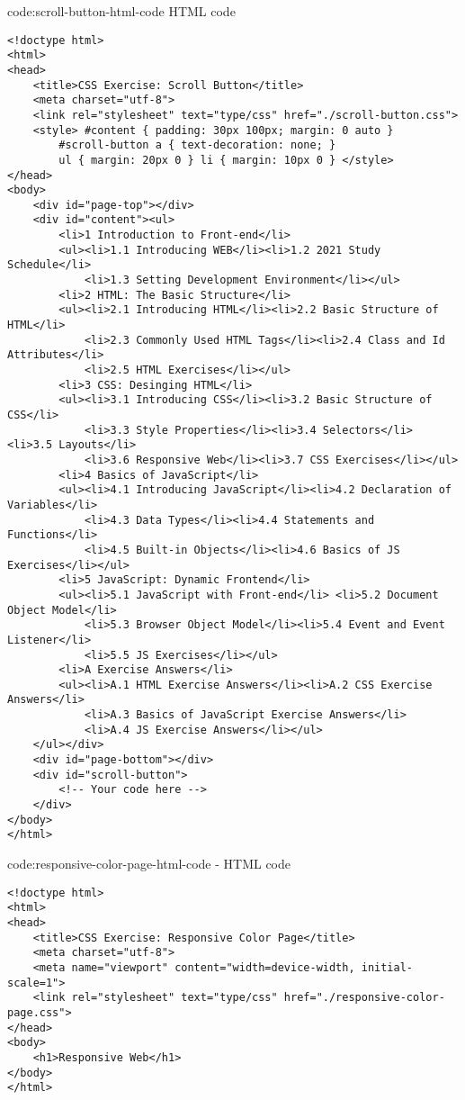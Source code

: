 \begin{codeenv}{code:scroll-button-html-code}{ HTML code}
\begin{verbatim}
<!doctype html>
<html>
<head>
    <title>CSS Exercise: Scroll Button</title>
    <meta charset="utf-8">
    <link rel="stylesheet" text="type/css" href="./scroll-button.css">
    <style> #content { padding: 30px 100px; margin: 0 auto }
        #scroll-button a { text-decoration: none; }
        ul { margin: 20px 0 } li { margin: 10px 0 } </style>
</head>
<body>
    <div id="page-top"></div>
    <div id="content"><ul>
        <li>1 Introduction to Front-end</li>
        <ul><li>1.1 Introducing WEB</li><li>1.2 2021 Study Schedule</li>
            <li>1.3 Setting Development Environment</li></ul>
        <li>2 HTML: The Basic Structure</li>
        <ul><li>2.1 Introducing HTML</li><li>2.2 Basic Structure of HTML</li>
            <li>2.3 Commonly Used HTML Tags</li><li>2.4 Class and Id Attributes</li>
            <li>2.5 HTML Exercises</li></ul>
        <li>3 CSS: Desinging HTML</li>
        <ul><li>3.1 Introducing CSS</li><li>3.2 Basic Structure of CSS</li>
            <li>3.3 Style Properties</li><li>3.4 Selectors</li> <li>3.5 Layouts</li>
            <li>3.6 Responsive Web</li><li>3.7 CSS Exercises</li></ul>
        <li>4 Basics of JavaScript</li>
        <ul><li>4.1 Introducing JavaScript</li><li>4.2 Declaration of Variables</li>
            <li>4.3 Data Types</li><li>4.4 Statements and Functions</li>
            <li>4.5 Built-in Objects</li><li>4.6 Basics of JS Exercises</li></ul>
        <li>5 JavaScript: Dynamic Frontend</li>
        <ul><li>5.1 JavaScript with Front-end</li> <li>5.2 Document Object Model</li>
            <li>5.3 Browser Object Model</li><li>5.4 Event and Event Listener</li>
            <li>5.5 JS Exercises</li></ul>
        <li>A Exercise Answers</li>
        <ul><li>A.1 HTML Exercise Answers</li><li>A.2 CSS Exercise Answers</li>
            <li>A.3 Basics of JavaScript Exercise Answers</li>
            <li>A.4 JS Exercise Answers</li></ul>
    </ul></div>
    <div id="page-bottom"></div>
    <div id="scroll-button">
        <!-- Your code here -->
    </div>
</body>
</html>
\end{verbatim}
\end{codeenv}

\begin{codeenv}{code:responsive-color-page-html-code}{ - HTML code}
\begin{verbatim}
<!doctype html>
<html>
<head>
    <title>CSS Exercise: Responsive Color Page</title>
    <meta charset="utf-8">
    <meta name="viewport" content="width=device-width, initial-scale=1">
    <link rel="stylesheet" text="type/css" href="./responsive-color-page.css">
</head>
<body>
    <h1>Responsive Web</h1>
</body>
</html>
\end{verbatim}
\end{codeenv}

